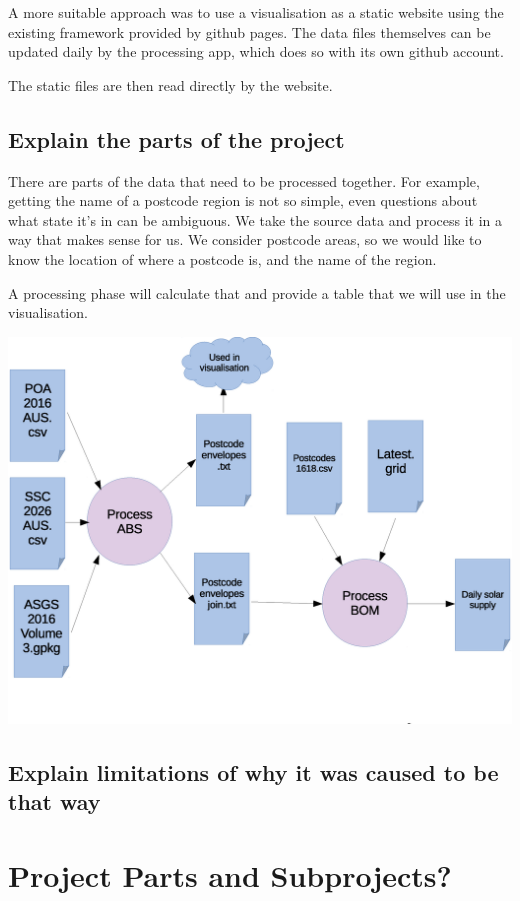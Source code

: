 \documentclass[12pt,a4paper]{report}
\begin{document}
A more suitable approach was to use a visualisation as a static website using the existing framework provided by github pages. The data files themselves can be updated daily by the processing app, which does so with its own github account.

The static files are then read directly by the website.

\subsection{Explain the parts of the project}

There are parts of the data that need to be processed together. For example, getting the name of a postcode region is not so simple, even questions about what state it's in can be ambiguous. We take the source data and process it in a way that makes sense for us. We consider postcode areas, so we would like to know the location of where a postcode is, and the name of the region.

A processing phase will calculate that and provide a table that we will use in the visualisation.

\includegraphics[scale=0.42]{file_process_1.eps}

\subsection{Explain limitations of why it was caused to be that way}

\section{Project Parts and Subprojects?}
\end{document}
